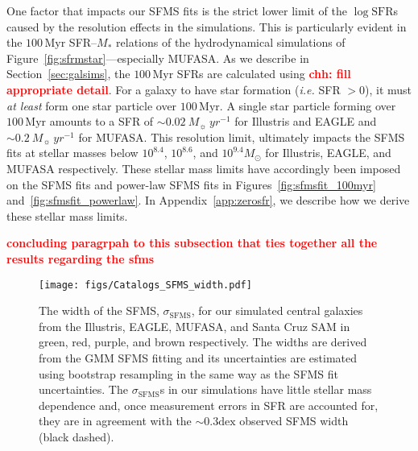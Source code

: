 \documentclass[preprint2,tighten]{aastex62}
\newcommand{\todo}[1]{{\bf \textcolor{red}{ #1}}}
\begin{document}
One factor that impacts our SFMS fits is the strict lower limit of the 
$\log\mathrm{SFR}$s caused by the resolution effects in the simulations. 
This is particularly evident in the $100\,\mathrm{Myr}$ SFR--$M_*$ 
relations of the hydrodynamical simulations of Figure~\ref{fig:sfrmstar}---especially 
MUFASA. As we describe in Section~\ref{sec:galsims}, the $100\,\mathrm{Myr}$ SFRs are 
calculated using \todo{chh: fill appropriate detail}. For a galaxy to 
have star formation (\emph{i.e.} SFR $> 0$), it must \emph{at least} 
form one star particle over $100\,\mathrm{Myr}$. A single star particle 
forming over $100\,\mathrm{Myr}$ amounts to a SFR of 
$\sim 0.02\ M_{\sun}\ yr^{-1}$ for Illustris and EAGLE and
$\sim 0.2\ M_{\sun}\ yr^{-1}$ for MUFASA. This resolution limit, ultimately 
impacts the SFMS fits at stellar masses below $10^{8.4}$, $10^{8.6}$, and 
$10^{9.4}M_\odot$ for Illustris, EAGLE, and MUFASA respectively. 
These stellar mass limits have accordingly been imposed on the SFMS fits
and power-law SFMS fits in Figures~\ref{fig:sfmsfit_100myr} 
and~\ref{fig:sfmsfit_powerlaw}. In Appendix~\ref{app:zerosfr}, we describe
how we derive these stellar mass limits. 

\todo{concluding paragrpah to this subsection that ties together all the
results regarding the sfms}

\begin{figure}
\begin{center}
\texttt{[image: figs/Catalogs\_SFMS\_width.pdf]}
\caption{The width of the SFMS, $\sigma_\mathrm{SFMS}$, for our simulated 
central galaxies from the Illustris, EAGLE, MUFASA, and Santa Cruz SAM in 
green, red, purple, and brown respectively. The widths are derived from  
the GMM SFMS fitting and its uncertainties are estimated using bootstrap
resampling in the same way as the SFMS fit uncertainties. The
$\sigma_\mathrm{SFMS}$s in our simulations have little stellar mass 
dependence and, once measurement errors in SFR are accounted for, they 
are in agreement with the $\sim 0.3\mathrm{dex}$ observed SFMS width 
(black dashed).} \label{fig:sfms_width}
\end{center}
\end{figure}
\end{document}

